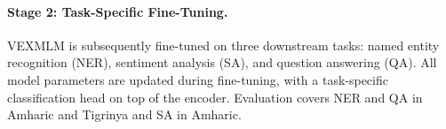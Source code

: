 \paragraph{Stage 2: Task-Specific Fine-Tuning.} VEXMLM is subsequently fine-tuned on three downstream tasks: named entity recognition (NER), sentiment analysis (SA), and question answering (QA). All model parameters are updated during fine-tuning, with a task-specific classification head on top of the encoder. Evaluation covers NER and QA in Amharic and Tigrinya and SA in Amharic.
